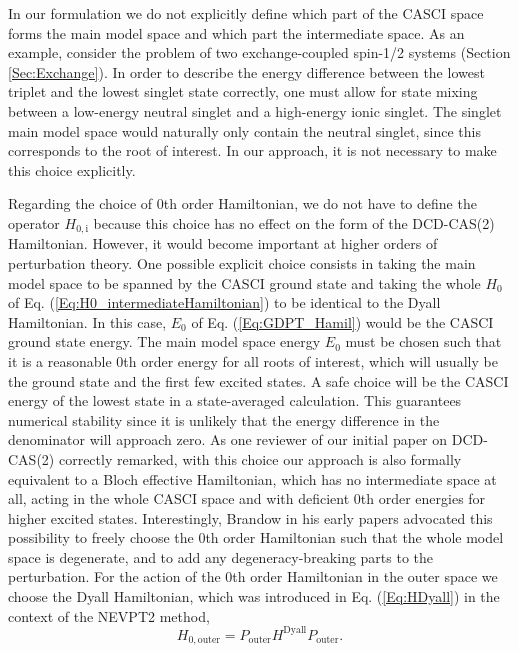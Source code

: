 In our formulation we do not explicitly define which part of the CASCI space forms the main model space and which part the intermediate space. As an example, consider the problem of two exchange-coupled spin-1/2 systems (Section \ref{Sec:Exchange}). In order to describe the energy difference between the lowest triplet and the lowest singlet state correctly, one must allow for state mixing between a low-energy neutral singlet and a high-energy ionic singlet. The singlet main model space would naturally only contain the neutral singlet, since this corresponds to the root of interest. In our approach, it is not necessary to make this choice explicitly.

Regarding the choice of 0th order Hamiltonian, we do not have to define the operator $H_{0, \text{i}}$ because this choice has no effect on the form of the DCD-CAS(2) Hamiltonian. However, it would become important at higher orders of perturbation theory. One possible explicit choice consists in taking the main model space to be spanned by the CASCI ground state and taking the whole $H_0$ of Eq. (\ref{Eq:H0_intermediateHamiltonian}) to be identical to the Dyall Hamiltonian. In this case, $E_0$ of Eq. (\ref{Eq:GDPT_Hamil}) would be the CASCI ground state energy. The main model space energy $E_0$ must be chosen such that it is a reasonable 0th order energy for all roots of interest, which will usually be the ground state and the first few excited states. A safe choice will be the CASCI energy of the lowest state in a state-averaged calculation. This guarantees numerical stability since it is unlikely that the energy difference in the denominator will approach zero. As one reviewer of our initial paper on DCD-CAS(2)\cite{PathaLN_2017_234109} correctly remarked, with this choice our approach is also formally equivalent to a Bloch effective Hamiltonian, which has no intermediate space at all, acting in the whole CASCI space and with deficient 0th order energies for higher excited states. Interestingly, Brandow in his early papers advocated this possibility to freely choose the 0th order Hamiltonian such that the whole model space is degenerate, and to add any degeneracy-breaking parts to the perturbation.\cite{Brand_1967_771, Brand_1979_207} For the action of the 0th order Hamiltonian in the outer space we choose the Dyall Hamiltonian, which was introduced in Eq. (\ref{Eq:HDyall}) in the context of the NEVPT2 method,
			\begin{equation}
			{H_{0,{\text{outer}}}} = {P_{{\text{outer}}}}{H^{{\text{Dyall}}}}{P_{{\text{outer}}}}.
			\end{equation}						
